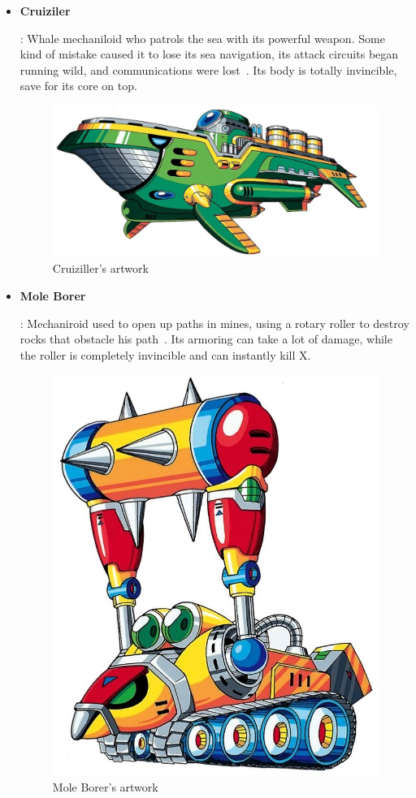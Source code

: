 \begin{itemize}
		\item
		 \hypertarget{enem:Cruiziler}{\textbf{Cruiziler}}: Whale mechaniloid who patrols the sea with its powerful weapon. Some kind of mistake caused it to lose its sea navigation, its attack circuits began running wild, and communications were lost~\cite{wayback:X_resources}. Its body is totally invincible, save for its core on top.
		\begin{figure}[htp]
			\centering
			\includegraphics[width=0.6\linewidth]{figures/X1/Enemies/Cruiziller.jpg}
			\caption{Cruiziller's artwork}
		\end{figure}
	
		\item \hypertarget{miniboss:Mole_Borer}{\textbf{Mole Borer}}:
		Mechaniroid used to open up paths in mines, using a 
		rotary roller to destroy rocks that obstacle his path~\cite{wayback:X_resources}. Its armoring can take a lot of damage, while the roller is completely invincible and can instantly kill X.
		\begin{figure}[htp]
			\centering
			\includegraphics[width=0.4\linewidth]{figures/X1/Enemies/MoleBorer.jpg}
			\caption{Mole Borer's artwork}
		\end{figure}
	

\end{itemize}
